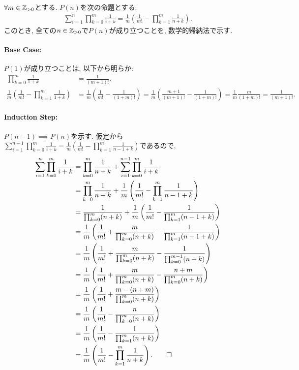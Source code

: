 \begin{proof*}
  $\forall m \in \mathbb{Z}_{>0}$とする.
  $P(n)$を次の命題とする:
  \begin{align*}
   \sum_{i=1}^n\prod_{k=0}^{m}\frac{1}{i+k}=\frac{1}{m}\left(\frac{1}{m!}-\prod_{k=1}^m\frac{1}{n+k}\right).
  \end{align*}
  このとき,
  全ての$n\in\mathbb{Z}_{>0}$で$P(n)$が成り立つことを,
  数学的帰納法で示す.

  \paragraph{Base Case:}
  $P(1)$が成り立つことは, 以下から明らか:
  \begin{align*}
    \prod_{k=0}^{m}\frac{1}{1+k}&=\frac{1}{(m+1)!}.\\
    \frac{1}{m}\left(\frac{1}{m!}-\prod_{k=1}^m\frac{1}{1+k}\right)
    &=\frac{1}{m}\left(\frac{1}{m!}-\frac{1}{(1+m)!}\right)
    =\frac{1}{m}\left(\frac{m+1}{(m+1)!}-\frac{1}{(1+m)!}\right)
    =\frac{1}{m}\frac{m}{(1+m)!}=\frac{1}{(m+1)!}.
  \end{align*}
  
  \paragraph{Induction Step:}
  $P(n-1)\implies P(n)$を示す.
  仮定から$\sum_{i=1}^{n-1}\prod_{k=0}^{m}\frac{1}{i+k}=\frac{1}{m}\left(\frac{1}{m!}-\prod_{k=1}^m\frac{1}{n-1+k}\right)$であるので,
  \begin{align*}
    \sum_{i=1}^n\prod_{k=0}^{m}\frac{1}{i+k}
    &=\prod_{k=0}^{m}\frac{1}{n+k}+\sum_{i=1}^{n-1}\prod_{k=0}^{m}\frac{1}{i+k}\\
    &=\prod_{k=0}^{m}\frac{1}{n+k}+\frac{1}{m}\left(\frac{1}{m!}-\prod_{k=1}^m\frac{1}{n-1+k}\right)\\
    &=\frac{1}{\prod_{k=0}^{m} (n+k)}+\frac{1}{m}\left(\frac{1}{m!}-\frac{1}{\prod_{k=1}^m(n-1+k)}\right)\\
    &=\frac{1}{m}\left(\frac{1}{m!}+\frac{m}{\prod_{k=0}^{m} (n+k)}-\frac{1}{\prod_{k=1}^m(n-1+k)}\right)\\
    &=\frac{1}{m}\left(\frac{1}{m!}+\frac{m}{\prod_{k=0}^{m} (n+k)}-\frac{1}{\prod_{k=0}^{m-1}(n+k)}\right)\\
    &=\frac{1}{m}\left(\frac{1}{m!}+\frac{m}{\prod_{k=0}^{m} (n+k)}-\frac{n+m}{\prod_{k=0}^{m}(n+k)}\right)\\
    &=\frac{1}{m}\left(\frac{1}{m!}+\frac{m-(n+m)}{\prod_{k=0}^{m} (n+k)}\right)\\
    &=\frac{1}{m}\left(\frac{1}{m!}-\frac{n}{\prod_{k=0}^{m} (n+k)}\right)\\
    &=\frac{1}{m}\left(\frac{1}{m!}-\frac{1}{\prod_{k=1}^{m} (n+k)}\right)\\
    &=\frac{1}{m}\left(\frac{1}{m!}-\prod_{k=1}^m\frac{1}{n+k}\right)
    .\qedhere
  \end{align*}
\end{proof*}
